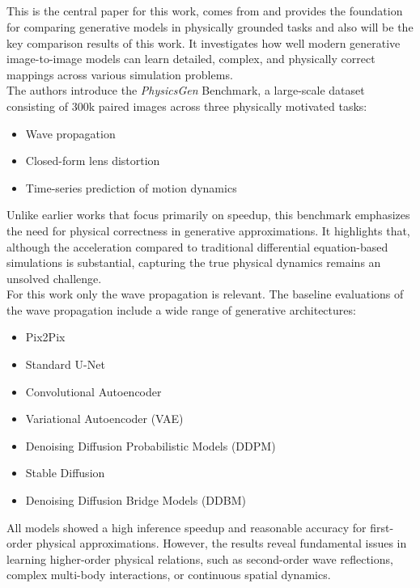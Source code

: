 		\subsection{}
			This is the central paper for this work, comes from \citeauthor{martin_spitznagel_physicsgen_2025} and provides the foundation for comparing generative models in physically grounded tasks and also will be the key comparison results of this work. It investigates how well modern generative image-to-image models can learn detailed, complex, and physically correct mappings across various simulation problems.\\
			The authors introduce the \textit{PhysicsGen} Benchmark, a large-scale dataset consisting of 300k paired images across three physically motivated tasks:
			\begin{itemize}[itemsep=1mm, parsep=0pt]
				\item Wave propagation
				\item Closed-form lens distortion
				\item Time-series prediction of motion dynamics
			\end{itemize}
			\clearpage
			Unlike earlier works that focus primarily on speedup, this benchmark emphasizes the need for physical correctness in generative approximations. It highlights that, although the acceleration compared to traditional differential equation-based simulations is substantial, capturing the true physical dynamics remains an unsolved challenge.\\
			For this work only the wave propagation is relevant. The baseline evaluations of the wave propagation include a wide range of generative architectures:
			\begin{itemize}[itemsep=1mm, parsep=0pt]
				\item Pix2Pix
				\item Standard U-Net
				\item Convolutional Autoencoder
				\item Variational Autoencoder (VAE)
				\item Denoising Diffusion Probabilistic Models (DDPM)
				\item Stable Diffusion
				\item Denoising Diffusion Bridge Models (DDBM)
			\end{itemize}
			All models showed a high inference speedup and reasonable accuracy for first-order physical approximations. However, the results reveal fundamental issues in learning higher-order physical relations, such as second-order wave reflections, complex multi-body interactions, or continuous spatial dynamics.\\
